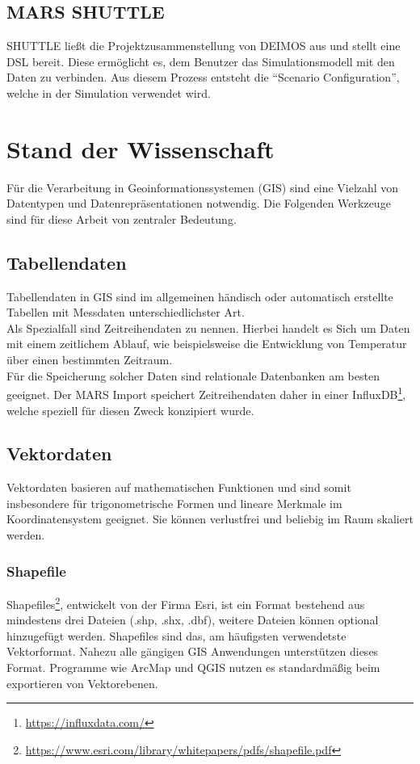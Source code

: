 \documentclass[10pt,conference,compsocconf]{IEEEtran}
\begin{document}
\subsection{MARS SHUTTLE}
SHUTTLE ließt die Projektzusammenstellung von DEIMOS aus und stellt eine DSL bereit. Diese ermöglicht es, dem Benutzer das Simulationsmodell mit den Daten zu verbinden. Aus diesem Prozess entsteht die \enquote{Scenario Configuration}, welche in der Simulation verwendet wird.\\



\section{Stand der Wissenschaft}
Für die Verarbeitung in Geoinformationssystemen (GIS) sind eine Vielzahl von Datentypen und Datenrepräsentationen notwendig. Die Folgenden Werkzeuge sind für diese Arbeit von zentraler Bedeutung.


\subsection{Tabellendaten}
Tabellendaten in GIS sind im allgemeinen händisch oder automatisch erstellte Tabellen mit Messdaten unterschiedlichster Art. \\
Als Spezialfall sind Zeitreihendaten zu nennen. Hierbei handelt es Sich um Daten mit einem zeitlichem Ablauf, wie beispielsweise die Entwicklung von Temperatur über einen bestimmten Zeitraum.\\
Für die Speicherung solcher Daten sind relationale Datenbanken am besten geeignet. Der MARS Import speichert Zeitreihendaten daher in einer InfluxDB\footnote{\url{https://influxdata.com/}}, welche speziell für diesen Zweck konzipiert wurde.


\subsection{Vektordaten}
Vektordaten basieren auf mathematischen Funktionen und sind somit insbesondere für trigonometrische Formen und lineare Merkmale im Koordinatensystem geeignet. Sie können verlustfrei und beliebig im Raum skaliert werden.

\subsubsection{Shapefile}
Shapefiles\footnote{\url{https://www.esri.com/library/whitepapers/pdfs/shapefile.pdf}}, entwickelt von der Firma Esri, ist ein Format bestehend aus mindestens drei Dateien (.shp, .shx, .dbf), weitere Dateien können optional hinzugefügt werden. Shapefiles sind das, am häufigsten verwendetste Vektorformat. Nahezu alle gängigen GIS Anwendungen unterstützen dieses Format. Programme wie ArcMap und QGIS nutzen es standardmäßig beim exportieren von Vektorebenen.
\end{document}
